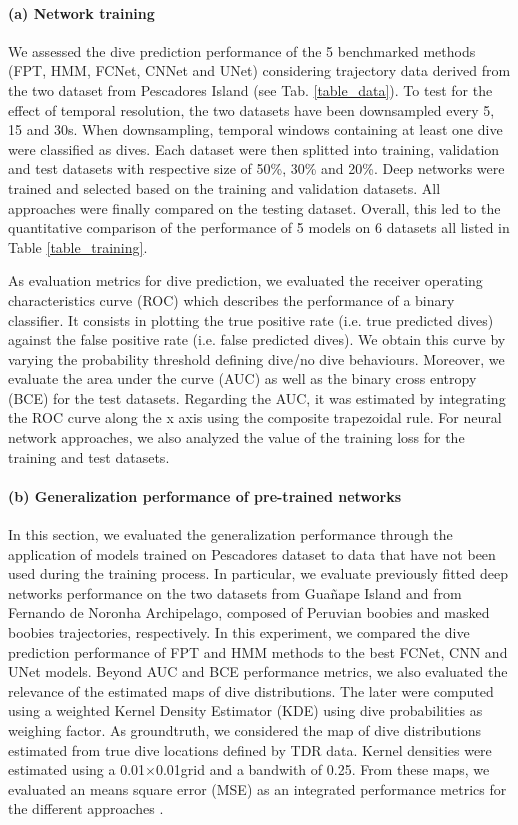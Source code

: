 \documentclass{article}
\begin{document}
\paragraph{(a) Network training}
We assessed the dive prediction performance of the 5 benchmarked methods (FPT, HMM, FCNet, CNNet and UNet) considering trajectory data derived from the two dataset from Pescadores Island (see Tab. \ref{table_data}). To test for the effect of temporal resolution, the two datasets have been downsampled every 5, 15 and 30s. When downsampling, temporal windows containing at least one dive were classified as dives. Each dataset were then splitted into training, validation and test datasets with respective size of 50\%, 30\% and 20\%. Deep networks were trained and selected based on the training and validation datasets. All approaches were finally compared on the testing dataset. Overall, this led to the quantitative comparison of the performance of 5 models on 6 datasets all listed in Table \ref{table_training}.

As evaluation metrics for dive prediction, we evaluated the receiver operating characteristics curve (ROC) which  describes the performance of a binary classifier. It consists in plotting the true positive rate (i.e. true predicted dives) against the false positive rate (i.e. false predicted dives). We obtain this curve by varying the probability threshold defining dive/no dive behaviours. Moreover, we evaluate the area under the curve (AUC) as well as the binary cross entropy (BCE) for the test datasets. Regarding the AUC, it was estimated by integrating the ROC curve along the x axis using the composite trapezoidal rule. For neural network approaches, we also analyzed the value of the training loss for the training and test datasets.

\paragraph{(b) Generalization performance of pre-trained networks}
In this section, we evaluated the generalization performance through the application of models trained on Pescadores dataset to data that have not been used during the training process. In particular, we evaluate previously fitted deep networks performance on the two datasets from Guañape Island and from Fernando de Noronha Archipelago, composed of Peruvian boobies and masked boobies trajectories, respectively. In this experiment, we compared the dive prediction performance of FPT and HMM methods to the best FCNet, CNN and UNet models. Beyond AUC and BCE performance metrics, we also evaluated the relevance of the estimated maps of dive distributions. The later were computed using a weighted Kernel Density Estimator (KDE) using dive probabilities as weighing factor. As groundtruth, we considered the map of dive distributions estimated from true dive locations defined by TDR data. Kernel densities were estimated using a 0.01$\times$0.01\degree grid and a bandwith of 0.25\degree. From these maps, we evaluated an means square error (MSE) as an integrated performance metrics for the different approaches \cite{wilson_distancebased_2011}.
\end{document}
